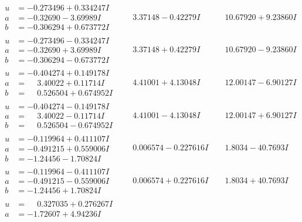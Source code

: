 \documentclass[1p]{elsarticle_modified}
\theoremstyle{definition}
\begin{document}
$$\begin{array}{c|c|c}
 \hline 
\begin{aligned}
u &= -0.273496 + 0.334247 I \\
a &= -0.32690 - 3.69989 I \\
b &= -0.306294 + 0.673772 I\end{aligned}
 & \phantom{-}3.37148 - 0.42279 I & \phantom{-}10.67920 + 9.23860 I \\ \hline\begin{aligned}
u &= -0.273496 - 0.334247 I \\
a &= -0.32690 + 3.69989 I \\
b &= -0.306294 - 0.673772 I\end{aligned}
 & \phantom{-}3.37148 + 0.42279 I & \phantom{-}10.67920 - 9.23860 I \\ \hline\begin{aligned}
u &= -0.404274 + 0.149178 I \\
a &= \phantom{-}3.40022 + 0.11714 I \\
b &= \phantom{-}0.526504 + 0.674952 I\end{aligned}
 & \phantom{-}4.41001 + 4.13048 I & \phantom{-}12.00147 - 6.90127 I \\ \hline\begin{aligned}
u &= -0.404274 - 0.149178 I \\
a &= \phantom{-}3.40022 - 0.11714 I \\
b &= \phantom{-}0.526504 - 0.674952 I\end{aligned}
 & \phantom{-}4.41001 - 4.13048 I & \phantom{-}12.00147 + 6.90127 I \\ \hline\begin{aligned}
u &= -0.119964 + 0.411107 I \\
a &= -0.491215 + 0.559006 I \\
b &= -1.24456 - 1.70824 I\end{aligned}
 & \phantom{-}0.006574 - 0.227616 I & \phantom{-}1.8034 - 40.7693 I \\ \hline\begin{aligned}
u &= -0.119964 - 0.411107 I \\
a &= -0.491215 - 0.559006 I \\
b &= -1.24456 + 1.70824 I\end{aligned}
 & \phantom{-}0.006574 + 0.227616 I & \phantom{-}1.8034 + 40.7693 I \\ \hline\begin{aligned}
u &= \phantom{-}0.327035 + 0.276267 I \\
a &= -1.72607 + 4.94236 I \\

\end{aligned}
\end{array}$$
\end{document}
